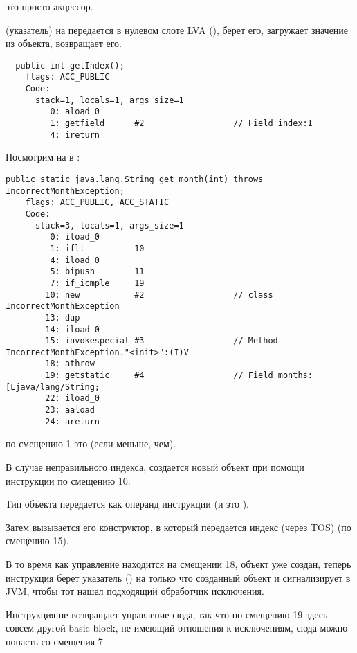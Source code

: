  это просто акцессор.

 (указатель) на  передается в нулевом слоте \ac{LVA}
(),  берет его,  загружает значение из объекта, 
 возвращает его.

\begin{lstlisting}
  public int getIndex();
    flags: ACC_PUBLIC
    Code:
      stack=1, locals=1, args_size=1
         0: aload_0       
         1: getfield      #2                  // Field index:I
         4: ireturn       
\end{lstlisting}

Посмотрим на  в :

\begin{lstlisting}[caption=Month2.class]
  public static java.lang.String get_month(int) throws IncorrectMonthException;
    flags: ACC_PUBLIC, ACC_STATIC
    Code:
      stack=3, locals=1, args_size=1
         0: iload_0       
         1: iflt          10
         4: iload_0       
         5: bipush        11
         7: if_icmple     19
        10: new           #2                  // class IncorrectMonthException
        13: dup           
        14: iload_0       
        15: invokespecial #3                  // Method IncorrectMonthException."<init>":(I)V
        18: athrow        
        19: getstatic     #4                  // Field months:[Ljava/lang/String;
        22: iload_0       
        23: aaload        
        24: areturn       
\end{lstlisting}

 по смещению 1 это  (если меньше, чем).

В случае неправильного индекса, создается новый объект при помощи инструкции  
по смещению 10.

Тип объекта передается как операнд инструкции (и это ).

Затем вызывается его конструктор, в который передается индекс (через \ac{TOS}) (по смещению 15).

В то время как управление находится на смещении 18, объект уже создан,
теперь инструкция  берет указатель ()
на только что созданный объект и сигнализирует в \ac{JVM}, чтобы тот нашел подходящий обработчик
исключения.

Инструкция  не возвращает управление сюда,
так что по смещению 19 здесь совсем другой \gls{basic block},
не имеющий отношения к исключениям, сюда можно попасть со смещения 7.

